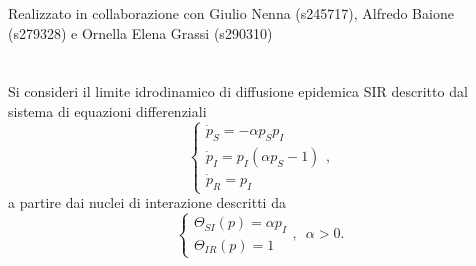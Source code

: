 \documentclass[11pt,largemargins]{homework}
\begin{document}
\maketitle
\begin{center}
Realizzato in collaborazione con Giulio Nenna (s245717),  Alfredo Baione (s279328) e Ornella Elena Grassi (s290310)
\end{center}
\section{}%
Si consideri il limite idrodinamico di diffusione epidemica SIR descritto dal sistema di equazioni differenziali
\begin{equation*}
\begin {cases} \dot{p}_{S}=-\alpha p_{S}p_{I}\\\dot{p}_{I}=p_{I}\left(\alpha p_{S}-1\right)\\\dot{p}_{R}=p_{I}\end{cases},
\end{equation*}
a partire dai nuclei di interazione descritti da
\begin{equation*}
\begin {cases} \Theta_{SI}\left(p\right)=\alpha p_{I}\\\Theta_{IR}\left(p\right)=1\end{cases}, \,\,\,\alpha>0.
\end{equation*}
\end{document}

